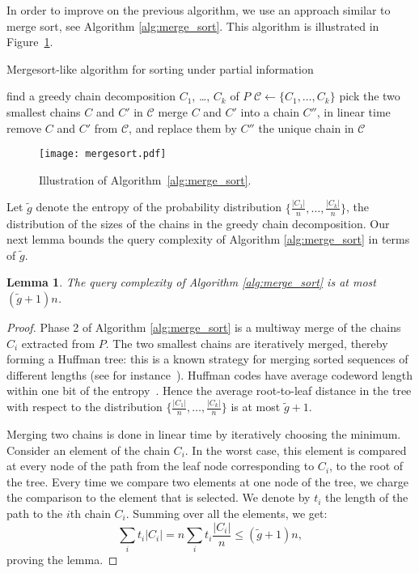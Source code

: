 \documentclass{article} \usepackage{fullpage}
\newtheorem{lemma}{Lemma}
\begin{document}
In order to improve on the previous algorithm, we use an approach similar to merge sort, see Algorithm \ref{alg:merge_sort}. This algorithm is illustrated in Figure~\ref{fig:merge_sort}.

\begin{algorithm}
\caption{Mergesort-like algorithm for sorting under partial information} \label{alg:merge_sort}
\begin{algorithmic}
\STATE {}
\STATE find a greedy chain decomposition $C_1$, \ldots, $C_k$ of $P$
\STATE $\mathcal{C} \gets \{C_1,\ldots,C_k\}$
\STATE {}
\STATE pick the two smallest chains $C$ and $C'$ in $\mathcal{C}$
\STATE merge $C$ and $C'$ into a chain $C''$, in linear time
\STATE remove $C$ and $C'$ from $\mathcal{C}$, and replace them by $C''$
\ENDWHILE
\RETURN the unique chain in $\mathcal{C}$
\end{algorithmic}
\end{algorithm}

\begin{figure}
\begin{center}
\texttt{[image: mergesort.pdf]}
\end{center}
\caption{\label{fig:merge_sort}Illustration of Algorithm~\ref{alg:merge_sort}.}
\end{figure}

Let $\tilde{g}$ denote the entropy of the probability distribution $\big\{\frac{|C_1|}{n},\ldots,\frac{|C_k|}{n}\big\}$, the distribution of the sizes of the chains in the greedy chain decomposition. Our next lemma bounds the query complexity of Algorithm \ref{alg:merge_sort} in terms of $\tilde{g}$.
\begin{lemma}
\label{lem:Huffman}
The query complexity of Algorithm \ref{alg:merge_sort} is at most $(\tilde{g}+1)n$.
\end{lemma}
\begin{proof}
Phase 2 of Algorithm \ref{alg:merge_sort} is a multiway merge of the chains $C_i$ extracted from $P$. The two smallest chains are iteratively merged, thereby forming a Huffman tree: this is a known strategy for merging sorted sequences of different lengths (see for instance~\cite{FB72}). Huffman codes have average codeword length within one bit of the entropy~\cite{TC}. Hence the average root-to-leaf distance in the tree with respect to the distribution $\big\{\frac{|C_1|}{n},\ldots,\frac{|C_k|}{n}\big\}$ is at most $\tilde{g} + 1$.

Merging two chains is done in linear time by iteratively choosing the minimum. Consider an element of the chain $C_i$. In the worst case, this element is compared at every node of the path from the leaf node corresponding to $C_i$, to the root of the tree. Every time we compare two elements at one node of the tree, we charge the comparison to the element that is selected. We denote by $t_i$ the length of the path to the $i$th chain $C_i$. Summing over all the elements, we get:
$$
\sum_i t_i |C_i| = n \sum_i t_i \frac{|C_i|}n \leq (\tilde{g} + 1)n,
$$
proving the lemma.
\end{proof}
\end{document}
